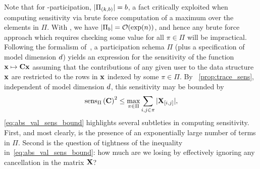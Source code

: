 \documentclass{article}
\begin{document}
Note that for \multiepoch-participation, $|\Pi_{(k,b)}| = b$, a fact \citet[Eq. 3]{choquette2022multi} critically exploited when computing sensitivity via brute force computation of a maximum over the elements in $\Pi$. With \bparticipation, we have $|\Pi_b| = \mathcal{O}(\exp(n))$,   and hence any brute force approach which requires checking some value for all $\pi \in \Pi$ will be impractical.
%
Following the formalism of~\citep[Section 2]{choquette2022multi}, a participation schema $\Pi$ (plus a specification of model dimension $d$) yields an expression for the sensitivity of the function $\mathbf{x} \mapsto \mathbf{C}\mathbf{x}$ assuming that the contributions of any given user to the data structure $\mathbf{x}$ are restricted to the rows in $\mathbf{x}$ indexed by some $\pi \in \Pi$. By ~\cref{prop:trace_sens}, independent of model dimension $d$, this sensitivity may be bounded by 
%
\begin{equation}\label{eq:abs_val_sens_bound}
    \operatorname{sens}_\Pi\left(\mathbf{C}\right)^2  \leq \max_{\pi \in \Pi} \sum_{i,j \in \pi} | \mathbf{X}_{[i,j]}|,
\end{equation}
%
%
%
%
%
\cref{eq:abs_val_sens_bound} highlights several subtleties in computing sensitivity. First, and most clearly, is the presence of an exponentially large number of terms in $\Pi$. Second is the question of tightness of the inequality in~\cref{eq:abs_val_sens_bound}: how much are we losing by effectively ignoring any cancellation in the matrix $\mathbf{X}$?
\end{document}
